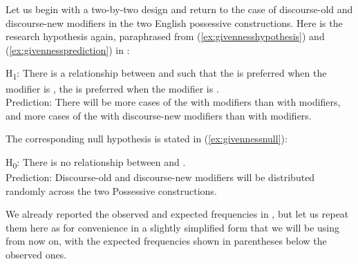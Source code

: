 Let us begin with a two\hyp{}by\hyp{}two design  and return to the case of discourse\hyp{}old and discourse\hyp{}new modifiers in the two English possessive  constructions. Here is the research hypothesis again, paraphrased from (\ref{ex:givennesshypothesis}) and (\ref{ex:givennessprediction}) in :

\begin{exe}
\ex H\textsubscript{1}: There is a relationship between  and  such that the  is preferred when the modifier is , the   is preferred when the modifier is .\\[2ex]
Prediction: There will be more cases of the  with  modifiers than with  modifiers, and more cases of the  with discourse\hyp{}new modifiers than with  modifiers.
\label{ex:givennessalternative}
\end{exe}

The corresponding null hypothesis  is stated in  (\ref{ex:givennessnull}):

\begin{exe}
\ex H\textsubscript{0}: There is no relationship between  and .\\[2ex]
Prediction: Discourse\hyp{}old and discourse\hyp{}new modifiers will be distributed  randomly  across the two Possessive  constructions.
\label{ex:givennessnull}
\end{exe}

We already reported the observed and expected  frequencies in , but let us repeat them here as  for convenience in a slightly simplified form that we will be using from now on, with the expected frequencies shown in parentheses below the observed ones.

